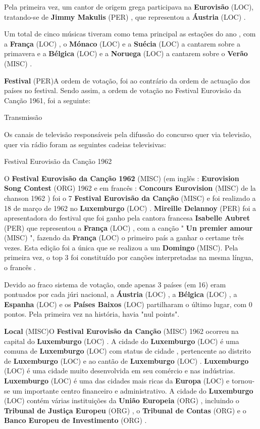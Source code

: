 \documentclass[12pt,a4paper]{article}
\begin{document}
Pela primeira vez, um cantor de origem grega participava na \textbf{Eurovisão} (LOC), tratando-se de \textbf{Jimmy Makulis} (PER) , que representou a \textbf{Áustria} (LOC) .

Um total de cinco músicas tiveram como tema principal as estações do ano , com a \textbf{França} (LOC) , o \textbf{Mónaco} (LOC) e a \textbf{Suécia} (LOC) a cantarem sobre a primavera e a \textbf{Bélgica} (LOC) e a \textbf{Noruega} (LOC) a cantarem sobre o \textbf{Verão} (MISC) .



\textbf{Festival} (PER)A ordem de votação, foi ao contrário da ordem de actuação dos países no festival. Sendo assim, a ordem de votação no Festival Eurovisão da Canção 1961, foi a seguinte:



Transmissão

Os canais de televisão responsáveis pela difussão do concurso quer via televisão, quer via rádio foram as seguintes cadeias televisivas:



Festival Eurovisão da Canção 1962



O \textbf{Festival Eurovisão da Canção 1962} (MISC) (em inglês : \textbf{Eurovision Song Contest} (ORG) 1962 e em francês : \textbf{Concours Eurovision} (MISC) de la chanson 1962 ) foi o 7 \textbf{Festival Eurovisão da Canção} (MISC) e foi realizado a 18 de março de 1962 no \textbf{Luxemburgo} (LOC) . \textbf{Mireille Delannoy} (PER) foi a apresentadora do festival que foi ganho pela cantora francesa \textbf{Isabelle Aubret} (PER) que representou a \textbf{França} (LOC) , com a canção " \textbf{Un premier amour} (MISC) ", fazendo da \textbf{França} (LOC) o primeiro país a ganhar o certame três vezes. Esta edição foi a única que se realizou a um \textbf{Domingo} (MISC). Pela primeira vez, o top 3 foi constituído por canções interpretadas na mesma língua, o francês .

Devido ao fraco sistema de votação, onde apenas 3 países (em 16) eram pontuados por cada júri nacional, a \textbf{Áustria} (LOC) , a \textbf{Bélgica} (LOC) , a \textbf{Espanha} (LOC) e os \textbf{Países Baixos} (LOC) partilharam o último lugar, com 0 pontos. Pela primeira vez na história, havia "nul points".



\textbf{Local} (MISC)O \textbf{Festival Eurovisão da Canção} (MISC) 1962 ocorreu na capital do \textbf{Luxemburgo} (LOC) . A cidade do \textbf{Luxemburgo} (LOC) é uma comuna de \textbf{Luxemburgo} (LOC) com status de cidade , pertencente ao distrito de \textbf{Luxemburgo} (LOC) e ao cantão de \textbf{Luxemburgo} (LOC) . \textbf{Luxemburgo} (LOC) é uma cidade muito desenvolvida em seu comércio e nas indústrias. \textbf{Luxemburgo} (LOC) é uma das cidades mais ricas da \textbf{Europa} (LOC) e tornou-se um importante centro financeiro e administrativo. A cidade do \textbf{Luxemburgo} (LOC) contém várias instituições da \textbf{União Europeia} (ORG) , incluindo o \textbf{Tribunal de Justiça Europeu} (ORG) , o \textbf{Tribunal de Contas} (ORG) e o \textbf{Banco Europeu de Investimento} (ORG) .
\end{document}
